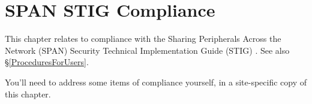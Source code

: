 %
%
%
\chapter{SPAN STIG Compliance}
\label{SPANSTIGCompliance}

This chapter relates to compliance with the Sharing Peripherals Across
the Network (SPAN) Security Technical Implementation Guide (STIG)
\cite{span-stig}. See also \S\ref{ProceduresForUsers}.

You'll need to address some items of compliance yourself, in a
site-specific copy of this chapter.
